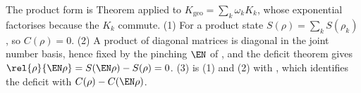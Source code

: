 The product form is Theorem  applied to $K_{\mathrm{geo}} = \sum_k \omega_k K_k$, whose exponential factorises because the $K_k$ commute. (1) For a product state $S(\rho) = \sum_k S(\rho_k)$, so $C(\rho) = 0$. (2) A product of diagonal matrices is diagonal in the joint number basis, hence fixed by the pinching $\EN$ of \cite[Def.~9.1]{ButlerT5}, and the deficit theorem gives $\rel{\rho}{\EN\rho} = S(\EN\rho) - S(\rho) = 0$. (3) is (1) and (2) with \cite[Cor.~9.4]{ButlerT5}, which identifies the deficit with $C(\rho) - C(\EN\rho)$.
